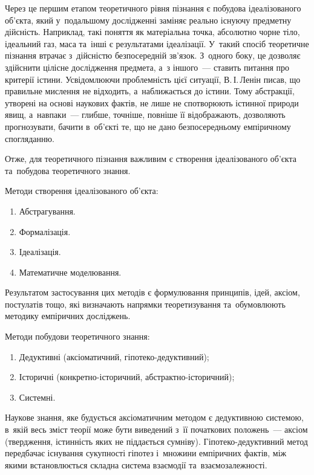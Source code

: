 \documentclass[a5paper,oneside,DIV=12,12pt,headings=small]{scrartcl}
\begin{document}
		Через це першим етапом теоретичного рівня пізнання є побудова ідеалізованого об'\-єкта, який у~подальшому дослідженні заміняє реально існуючу предметну дійсність. Наприклад, такі поняття як матеріальна точка, абсолютно чорне тіло, ідеальний газ, маса та~інші є результатами ідеалізації. У~такий спосіб теоретичне пізнання втрачає з~дійсністю безпосередній зв'язок. З~одного боку, це дозволяє здійснити цілісне дослідження предмета, а~з іншого~— ставить питання про критерії істини. Усвідомлюючи проблемність цієї ситуації, В.\,І.\,Ленін писав, що правильне мислення не відходить, а~наближається до істини. Тому абстракції, утворені на основі наукових фактів, не лише не спотворюють істинної природи явищ, а~навпаки~— глибше, точніше, повніше її відображають, дозволяють прогнозувати, бачити в~об'\-єкті те, що не дано безпосередньому емпіричному спогляданню.
		
		Отже, для теоретичного пізнання важливим є створення ідеалізованого об'\-єкта та~побудова теоретичного знання.
		
		Методи створення ідеалізованого об'\-єкта:
		\begin{enumerate}
			\item Абстрагування.
			\item Формалізація.
			\item Ідеалізація.
			\item Математичне моделювання.
		\end{enumerate}
		
		Результатом застосування цих методів є формулювання принципів, ідей, аксіом, постулатів тощо, які визначають напрямки теоретизування та~обумовлюють методику емпіричних досліджень.
		
		Методи побудови теоретичного знання:
		\begin{enumerate}
			\item Дедуктивні (аксіоматичний, гіпотеко-дедуктивний);
			\item Історичні (конкретно-історичний, аб\-стракт\-но-іс\-то\-рич\-ний);
			\item Системні.
		\end{enumerate}
		
		Наукове знання, яке будується аксіоматичним методом є дедуктивною системою, в~якій весь зміст теорії може бути виведений з~її початкових положень~— аксіом (твердження, істинність яких не піддається сумніву). Гіпотеко-дедуктивний метод передбачає існування сукупності гіпотез і~множини емпіричних фактів, між якими встановлюється складна система взаємодії та~взаємозалежності.
		 
\end{document}
